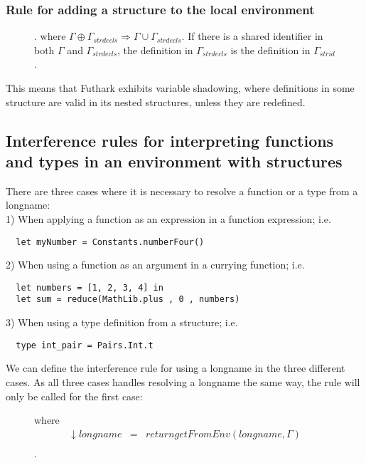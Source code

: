 \subsubsection{Rule for adding a structure to the local environment}
\begin{figure}\label{Rule3}
  \begin{tcolorbox}
    \begin{prooftree}
    \end{prooftree}.
    where $\Gamma \oplus \Gamma_{strdecls} \Rightarrow \Gamma \cup
    \Gamma_{strdecls}.$
    If there is a shared identifier in both $\Gamma$ and $\Gamma_{strdecls}$,
    the definition in $\Gamma_{strdecls}$ is the definition in $\Gamma_{strid}$.
  \end{tcolorbox}
\end{figure}
This means that Futhark exhibits variable shadowing, where definitions in some
structure are valid in its nested structures, unless they are redefined.

\subsection{Interference rules for interpreting functions and types in an
  environment with structures}\label{interpretingfunctionsandtypeswithstructures}
There are three cases where it is necessary to resolve a function or a type from a
longname:\\
1) When applying a function as an expression in a function expression; i.e.
\begin{verbatim}
  let myNumber = Constants.numberFour()
\end{verbatim}
2) When using a function as an argument in a currying function; i.e.
\begin{verbatim}
  let numbers = [1, 2, 3, 4] in
  let sum = reduce(MathLib.plus , 0 , numbers)
\end{verbatim}
3) When using a type definition from a structure; i.e.
\begin{verbatim}
  type int_pair = Pairs.Int.t 
\end{verbatim}
We can define the interference rule for using a longname in the three different
cases. As all three cases handles resolving a longname the same way, the rule
will only be called for the first case:
\begin{figure}\label{Rule5}
  \begin{prooftree}
  \end{prooftree}
  where
  \begin{align*}
    \downarrow longname & = & return getFromEnv(longname , \Gamma) \\
  \end{align*}.
\end{figure}
